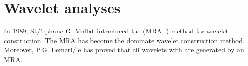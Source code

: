 \section{Wavelet analyses}
%
  In 1989, St{/'e}phane G. Mallat introduced the  (MRA, )
  method for wavelet construction. The MRA has become the dominate wavelet construction method.
  Moreover, P.G. Lemari{/'e} has proved that all wavelets with  are generated by an MRA.\footnotemark


